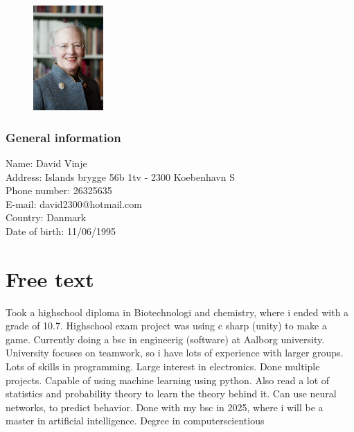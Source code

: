 \begin{figure} %
 \hfill\includegraphics[height=40mm]{figures/1200px-Drottning_Margrethe_av_Danmark} %
 \caption*{}
 \end{figure}

\subsubsection*{General information}
Name: David Vinje \\
Address: Islands brygge 56b 1tv - 2300 Koebenhavn S \\
Phone number: 26325635 \\
E-mail: david2300@hotmail.com \\
Country: Danmark \\
Date of birth: 11/06/1995 \\


\section*{Free text}
Took a highschool diploma in Biotechnologi and chemistry, where i ended with a grade of 10.7.
Highschool exam project was using c sharp (unity) to make a game.
Currently doing a bsc in engineerig (software) at Aalborg university.
University focuses on teamwork, so i have lots of experience with larger groups.
Lots of skills in programming.
Large interest in electronics. Done multiple projects.
Capable of using machine learning using python. Also read a lot of statistics and probability theory to learn the theory behind it. Can use neural networks, to predict behavior.
Done with my bsc in 2025, where i will be a master in artificial intelligence.
Degree in computerscientious

